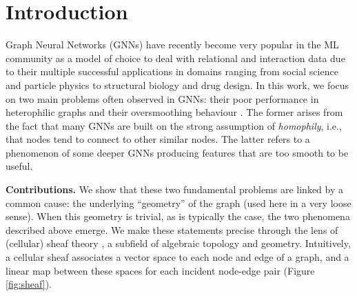 \documentclass{article}
\begin{document}
\section{Introduction}

Graph Neural Networks (GNNs) 
\cite{sperduti1994encoding,goller1996learning,gori2005new,scarselli2008graph,bruna2013spectral,defferrard2016convolutional,kipf2017graph,gilmer2017neural}
have recently become very popular in the ML community as a model of choice to deal with relational and interaction data due to their multiple successful applications in domains ranging from social science and particle physics to structural biology and drug design.  In this work, we focus on two main problems often observed in GNNs: their poor performance in heterophilic graphs \cite{zhu2020beyond} and their oversmoothing behaviour \cite{os1,os2}. The former arises from the fact that many GNNs are built on the strong assumption of {\em homophily}, i.e., that nodes tend to connect to other similar nodes. The latter refers to a phenomenon of some deeper GNNs producing features that are too smooth to be useful.  

\textbf{Contributions. } We show that these two fundamental problems are linked by a common cause: the underlying ``geometry'' of the graph (used here in a very loose sense). When this geometry is trivial, as is typically the case, the two phenomena described above emerge. We make these statements precise through the lens of (cellular) sheaf theory \citep{curry2014sheaves, shepard1985cellular, bredon2012sheaf, maclane2012sheaves, rosiak2021sheaf, ghrist2014elementary}, a subfield of algebraic topology and geometry. Intuitively, a cellular sheaf associates a vector space to each node and edge of a graph, and a linear map between these spaces for each incident node-edge pair (Figure \ref{fig:sheaf}).
\end{document}
